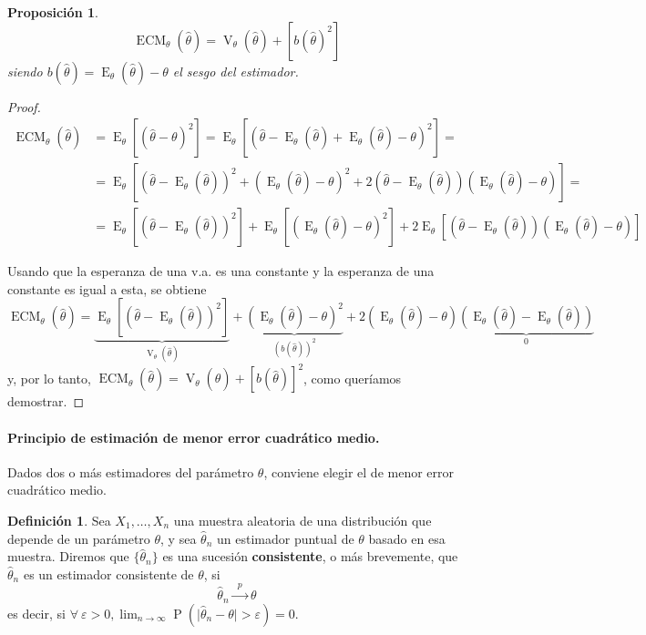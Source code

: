 \documentclass[11pt]{article}
\theoremstyle{plain}
\newtheorem*{pro}{Proposición}
\theoremstyle{definition}
\newtheorem*{defi}{Definición}
\theoremstyle{remark}
\newcommand{\deft}[1]{\textbf{#1}}  %
\newcommand{\proba}{\ensuremath{\operatorname{P}}}  %
\newcommand{\esp}[0]{\ensuremath{\operatorname{E}}}  %
\newcommand{\var}[0]{\ensuremath{\operatorname{V}}}  %
\newcommand{\foralle}{\ensuremath{\forall \ }}  %
\newcommand{\tiende}[1]{\ensuremath{\xrightarrow{\;\; #1 \;\;}}}  %
\begin{document}
      \begin{pro}
        \[ \operatorname{ECM}_\theta(\hat \theta) = \var_\theta(\hat \theta) + \left[ b(\hat \theta)^2 \right] \]
        siendo $b(\hat \theta) = \esp_\theta(\hat \theta) - \theta$ el sesgo del estimador.
      \end{pro}
      \begin{proof}
        \[ \begin{split}
          \operatorname{ECM}_\theta(\hat \theta) &= \esp_\theta \left[ (\hat \theta - \theta)^2 \right] = \esp_\theta \left[ (\hat \theta - \esp_\theta(\hat \theta) + \esp_\theta(\hat \theta) - \theta)^2 \right] = \\
          &= \esp_\theta \left[ (\hat \theta - \esp_\theta(\hat \theta))^2 + (\esp_\theta(\hat \theta) - \theta)^2 + 2 (\hat \theta - \esp_\theta(\hat \theta)) (\esp_\theta(\hat \theta) - \theta) \right] = \\
          &= \esp_\theta \left[ (\hat \theta - \esp_\theta(\hat \theta))^2 \right] + \esp_\theta \left[ (\esp_\theta(\hat \theta) - \theta)^2 \right] + 2 \esp_\theta \left[ (\hat \theta - \esp_\theta(\hat \theta)) (\esp_\theta(\hat \theta) - \theta) \right]
        \end{split} \]

        Usando que la esperanza de una v.a. es una constante y la esperanza de una constante es igual a esta, se obtiene
        \[ \operatorname{ECM}_\theta(\hat \theta) = \underbrace{\esp_\theta \left[ (\hat \theta - \esp_\theta(\hat \theta))^2 \right]}_{\var_\theta(\hat \theta)} + \underbrace{(\esp_\theta(\hat \theta) - \theta)^2}_{(b(\hat \theta))^2} + 2 (\esp_\theta(\hat \theta) - \theta) \underbrace{(\esp_\theta(\hat \theta) - \esp_\theta(\hat \theta))}_{0} \]
        y, por lo tanto, $\operatorname{ECM}_\theta(\hat \theta) = \var_\theta(\hat \theta) + [b(\hat \theta)]^2$, como queríamos demostrar.
      \end{proof}

      \paragraph{Principio de estimación de menor error cuadrático medio.} Dados dos o más estimadores del parámetro $\theta$, conviene elegir el de menor error cuadrático medio.

      \begin{defi}
        Sea $X_1, \dots, X_n$ una muestra aleatoria de una distribución que depende de un parámetro $\theta$, y sea $\hat \theta_n$ un estimador puntual de $\theta$ basado en esa muestra. Diremos que $\lbrace \hat \theta_n \rbrace$ es una sucesión \deft{consistente}, o más brevemente, que $\hat \theta_n$ es un estimador consistente de $\theta$, si
        \[ \hat \theta_n \tiende{p} \theta \]
        es decir, si $\foralle \varepsilon > 0, \lim_{n \to \infty} \proba(\vert \hat \theta_n - \theta \vert > \varepsilon) = 0$.
      \end{defi}
\end{document}
